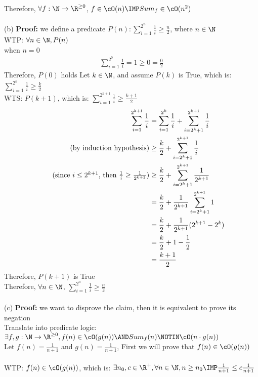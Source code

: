 \documentclass[12pt]{article}
\begin{document}
Therefore, $\forall f: \N \to \R^{\ge 0}$, $f \in \cO(n) \IMP Sum_f \in \cO(n^2)$\\
\\
(b) \textbf{Proof:} we define a predicate $P(n): \sum_{i = 1}^{2^n}\frac{1}{i} \ge \frac{n}{2}$, where $n \in \N$\\
WTP: $\forall n \in \N, P(n)$\\
\base\quad when $n = 0$\\
\begin{align*}
    \sum_{i = 1}^{2^0}\frac{1}{i} = 1 \ge 0 = \frac{0}{2}
\end{align*}
Therefore, $P(0)$ holds
\newpage
\istep\quad Let $k \in \N$, and assume $P(k)$ is True, which is: $\sum_{i = 1}^{2^k}\frac{1}{i} \ge \frac{k}{2}$\\
WTS: $P(k+1)$, which is: $\sum_{i = 1}^{2^{k+1}}\frac{1}{i} \ge \frac{k+1}{2}$\\
\begin{align*}
    \sum_{i=1}^{2^{k+1}}\frac{1}{i} &= \sum_{i=1}^{2^k}\frac{1}{i} + \sum_{i=2^k +1}^{2^{k+1}}\frac{1}{i}\\
    \tag{by induction hypothesis}
    &\ge \frac{k}{2} + \sum_{i=2^k +1}^{2^{k+1}}\frac{1}{i}\\
    \tag{since $i \le 2^{k+1}$, then $\frac{1}{i} \ge \frac{1}{2^{k+1}}$}
    &\ge \frac{k}{2} + \sum_{i=2^k+1}^{2^{k+1}}\frac{1}{2^{k+1}}\\
    &= \frac{k}{2} + \frac{1}{2^{k+1}}\sum_{i=2^k+1}^{2^{k+1}}1\\
    &= \frac{k}{2} + \frac{1}{2^{k+1}}(2^{k+1} - 2^k)\\
    &= \frac{k}{2} + 1 - \frac{1}{2}\\
    &= \frac{k+1}{2}
\end{align*}
Therefore, $P(k+1)$ is True\\
Therefore, $\forall n \in \N$, $\sum_{i = 1}^{2^n}\frac{1}{i} \ge \frac{n}{2}$\\
\\
(c) \textbf{Proof:} we want to disprove the claim, then it is equivalent to prove its negation\\
Translate into predicate logic: $\exists f, g: \N \to \R^{\ge 0}, f(n) \in \cO(g(n)) \AND Sum_f(n) \NOTIN \cO(n\cdot g(n))$\\
Let $f(n) = \frac{1}{n + 1}$ and $g(n) = \frac{1}{n + 1}$, First we will prove that $f(n) \in \cO(g(n))$\\
\\
WTP: $f(n) \in \cO(g(n))$, which is: $\exists n_0,c\in \R^{+}, \forall n \in \N, n \ge n_0 \IMP \frac{1}{n+1} \le c\frac{1}{n+1}$\\
\end{document}

